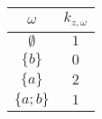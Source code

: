 \begin{frame}[c]
\begin{columns}
\begin{column}{0.6\textwidth}
\end{column}
\begin{column}{0.4\textwidth}

\begin{tabular}{c|c}
  $\omega$ & $k_{z, \omega}$ \\
\hline
  $\emptyset$ & $1$ \\
  $\{b\}$ & $0$ \\
  $\{a\}$ & $2$ \\
  $\{a;b\}$ & $1$
\end{tabular}

\end{column}
\end{columns}


\end{frame}
